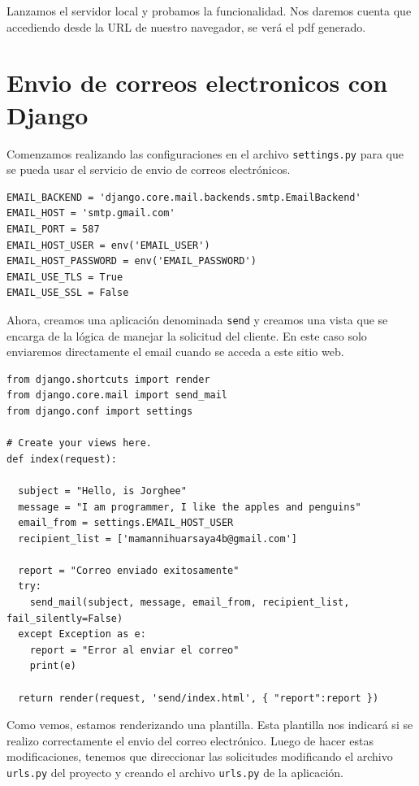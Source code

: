 \documentclass[10pt, a4paper]{article}
\newcommand{\mpy}[1]{\texttt{#1}}
\begin{document}
Lanzamos el servidor local y probamos la funcionalidad. Nos daremos cuenta que accediendo desde la URL de nuestro navegador, se verá el pdf generado.

\section{Envio de correos electronicos con Django}
Comenzamos realizando las configuraciones en el archivo \mpy{settings.py} para que se pueda usar el servicio de envio de correos electrónicos.

\begin{verbatim}
EMAIL_BACKEND = 'django.core.mail.backends.smtp.EmailBackend'
EMAIL_HOST = 'smtp.gmail.com'
EMAIL_PORT = 587
EMAIL_HOST_USER = env('EMAIL_USER')
EMAIL_HOST_PASSWORD = env('EMAIL_PASSWORD')
EMAIL_USE_TLS = True
EMAIL_USE_SSL = False
\end{verbatim}

Ahora, creamos una aplicación denominada \mpy{send} y creamos una vista que se encarga de la lógica de manejar la solicitud del cliente. En este caso solo enviaremos directamente el email cuando se acceda a este sitio web.

\begin{verbatim}
from django.shortcuts import render
from django.core.mail import send_mail
from django.conf import settings

# Create your views here.
def index(request):

  subject = "Hello, is Jorghee"
  message = "I am programmer, I like the apples and penguins"
  email_from = settings.EMAIL_HOST_USER
  recipient_list = ['mamannihuarsaya4b@gmail.com']

  report = "Correo enviado exitosamente"
  try:
    send_mail(subject, message, email_from, recipient_list, fail_silently=False)
  except Exception as e:
    report = "Error al enviar el correo"
    print(e)

  return render(request, 'send/index.html', { "report":report })
\end{verbatim}

Como vemos, estamos renderizando una plantilla. Esta plantilla nos indicará si se realizo correctamente el envio del correo electrónico. Luego de hacer estas modificaciones, tenemos que direccionar las solicitudes modificando el archivo \mpy{urls.py} del proyecto y creando el archivo \mpy{urls.py} de la aplicación.
\end{document}
